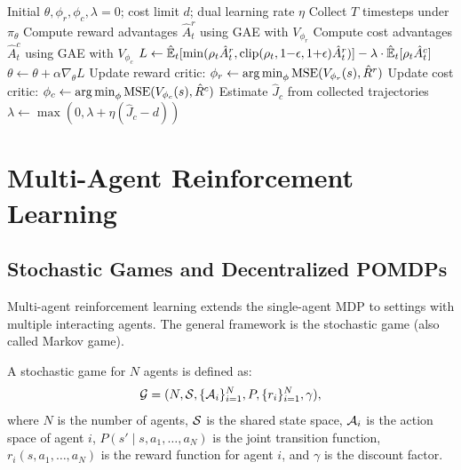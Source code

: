 \begin{algorithm}[htbp]
\caption{OnCRPO (Online Constrained Reward Policy Optimization)}
\label{alg:oncrpo}
\begin{algorithmic}[1]
\Require Initial $\theta, \phi_r, \phi_c, \lambda = 0$; cost limit $d$; dual learning rate $\eta$
    \State Collect $T$ timesteps under $\pi_\theta$
    \State Compute reward advantages $\hat{A}^r_t$ using GAE with $V_{\phi_r}$
    \State Compute cost advantages $\hat{A}^c_t$ using GAE with $V_{\phi_c}$
        \State $L \gets \hat{\mathbb{E}}_t[\min(\rho_t \hat{A}^r_t, \operatorname{clip}(\rho_t, 1{-}\epsilon, 1{+}\epsilon) \hat{A}^r_t)] - \lambda \cdot \hat{\mathbb{E}}_t[\rho_t \hat{A}^c_t]$
        \State $\theta \gets \theta + \alpha \nabla_\theta L$
    \EndFor
    \State Update reward critic: $\phi_r \gets \operatorname*{arg\,min}_{\phi} \text{MSE}(V_{\phi_r}(s), \hat{R}^r)$
    \State Update cost critic: $\phi_c \gets \operatorname*{arg\,min}_{\phi} \text{MSE}(V_{\phi_c}(s), \hat{R}^c)$
    \State Estimate $\hat{J}_c$ from collected trajectories
    \State $\lambda \gets \max(0, \lambda + \eta(\hat{J}_c - d))$
\EndFor
\end{algorithmic}
\end{algorithm}

\section{Multi-Agent Reinforcement Learning}
\label{sec:marl_prelim}

\subsection{Stochastic Games and Decentralized POMDPs}

Multi-agent reinforcement learning extends the single-agent MDP to settings with multiple interacting agents. The general framework is the stochastic game (also called Markov game).

\begin{definition}
A stochastic game for $N$ agents is defined as:
\begin{equation}
    \mathcal{G} = (N, \mathcal{S}, \{\mathcal{A}_i\}_{i=1}^{N}, P, \{r_i\}_{i=1}^{N}, \gamma),
\end{equation}
where $N$ is the number of agents, $\mathcal{S}$ is the shared state space, $\mathcal{A}_i$ is the action space of agent $i$, $P(s' \mid s, a_1, \ldots, a_N)$ is the joint transition function, $r_i(s, a_1, \ldots, a_N)$ is the reward function for agent $i$, and $\gamma$ is the discount factor.
\end{definition}

